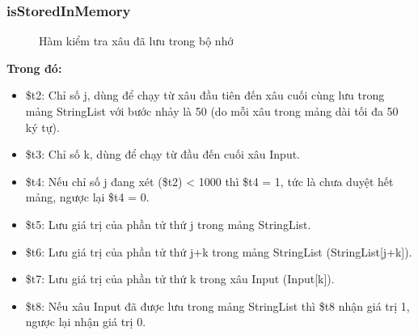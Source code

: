 \documentclass[a4paper,12pt]{article}
\begin{document}
\subsubsection{isStoredInMemory}
\begin{figure}[!h]
	\centerline{}
	\label{fig:bai6}
\end{figure}
\begin{figure}[!h]
	\centerline{}
	\caption{Hàm kiểm tra xâu đã lưu trong bộ nhớ}
	\label{fig:bai6}
\end{figure}
\clearpage
\noindent
\textbf{Trong đó: }
\begin{itemize}
    \item \$t2: Chỉ số j, dùng để chạy từ xâu đầu tiên đến xâu cuối cùng lưu trong mảng StringList với bước nhảy là 50 (do mỗi xâu trong mảng dài tối đa 50 ký tự).
    \item \$t3: Chỉ số k, dùng để chạy từ đầu đến cuối xâu Input.
    \item \$t4: Nếu chỉ số j đang xét (\$t2) < 1000 thì \$t4 = 1, tức là chưa duyệt hết mảng, ngược lại \$t4 = 0.
    \item \$t5: Lưu giá trị của phần tử thứ j trong mảng StringList.
    \item \$t6: Lưu giá trị của phần tử thứ j+k trong mảng StringList (StringList[j+k]).
    \item \$t7: Lưu giá trị của phần tử thứ k trong xâu Input (Input[k]).
    \item \$t8: Nếu xâu Input đã được lưu trong mảng StringList thì \$t8 nhận giá trị 1, ngược lại nhận giá trị 0.
\end{itemize}
\end{document}
